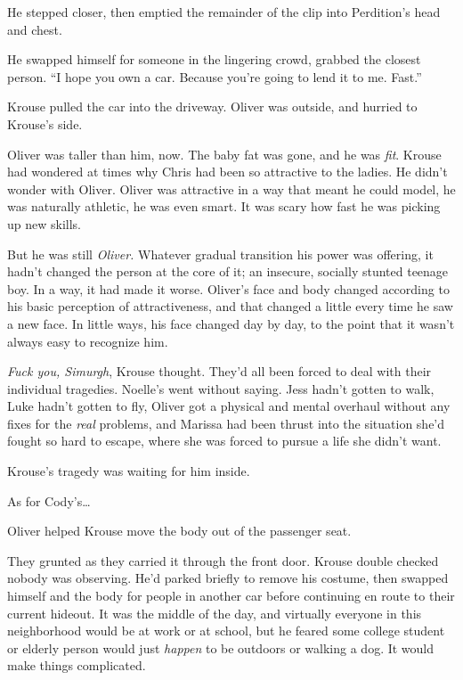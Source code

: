 He stepped closer, then emptied the remainder of the clip into Perdition's head and chest.



He swapped himself for someone in the lingering crowd, grabbed the closest person.  ``I hope you own a car.  Because you're going to lend it to me.  Fast.''



\blacksquare



Krouse pulled the car into the driveway.  Oliver was outside, and hurried to Krouse's side.



Oliver was taller than him, now.  The baby fat was gone, and he was \emph{fit}.  Krouse had wondered at times why Chris had been so attractive to the ladies.  He didn't wonder with Oliver.  Oliver was attractive in a way that meant he could model, he was naturally athletic, he was even smart.  It was scary how fast he was picking up new skills.



But he was still \emph{Oliver.  }Whatever gradual transition his power was offering, it hadn't changed the person at the core of it; an insecure, socially stunted teenage boy.  In a way, it had made it worse.  Oliver's face and body changed according to his basic perception of attractiveness, and that changed a little every time he saw a new face.  In little ways, his face changed day by day, to the point that it wasn't always easy to recognize him.



\emph{Fuck you, Simurgh}, Krouse thought.  They'd all been forced to deal with their individual tragedies.  Noelle's went without saying.  Jess hadn't gotten to walk, Luke hadn't gotten to fly, Oliver got a physical and mental overhaul without any fixes for the \emph{real} problems, and Marissa had been thrust into the situation she'd fought so hard to escape, where she was forced to pursue a life she didn't want.



Krouse's tragedy was waiting for him inside.



As for Cody's\ldots



Oliver helped Krouse move the body out of the passenger seat.



They grunted as they carried it through the front door.  Krouse double checked nobody was observing.  He'd parked briefly to remove his costume, then swapped himself and the body for people in another car before continuing en route to their current hideout.  It was the middle of the day, and virtually everyone in this neighborhood would be at work or at school, but he feared some college student or elderly person would just \emph{happen} to be outdoors or walking a dog.  It would make things complicated.



